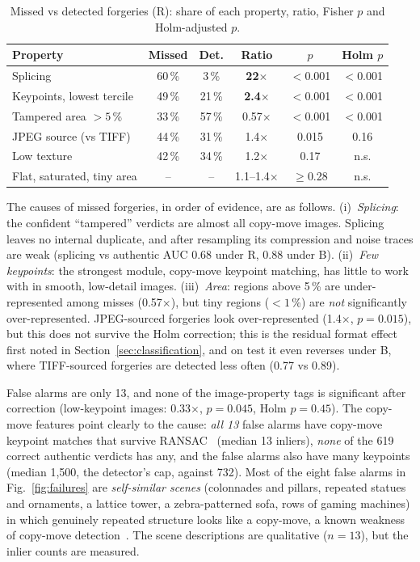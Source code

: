 \begin{table}[t]
\centering
\caption{Missed vs detected forgeries (R): share of each property, ratio, Fisher $p$ and Holm-adjusted
$p$.}\label{tab:test-fisher}
\footnotesize
\setlength{\tabcolsep}{4pt}
\begin{tabular}{lccccc}
\toprule
Property & Missed & Det. & Ratio & $p$ & Holm $p$ \\
\midrule
Splicing                    & 60\,\% & 3\,\%  & \textbf{22$\times$}  & $<$0.001 & $<$0.001 \\
Keypoints, lowest tercile   & 49\,\% & 21\,\% & \textbf{2.4$\times$} & $<$0.001 & $<$0.001 \\
Tampered area $>5$\,\%      & 33\,\% & 57\,\% & 0.57$\times$ & $<$0.001 & $<$0.001 \\
JPEG source (vs TIFF)       & 44\,\% & 31\,\% & 1.4$\times$  & 0.015 & 0.16 \\
Low texture                 & 42\,\% & 34\,\% & 1.2$\times$  & 0.17  & n.s. \\
Flat, saturated, tiny area  & --     & --     & 1.1--1.4$\times$ & $\geq$0.28 & n.s. \\
\bottomrule
\end{tabular}
\end{table}

The causes of missed forgeries, in order of evidence, are as follows. (i)~\emph{Splicing}: the confident
``tampered'' verdicts are almost all copy-move images. Splicing leaves no internal duplicate, and after
resampling its compression and noise traces are weak (splicing vs authentic AUC 0.68 under R, 0.88 under B).
(ii)~\emph{Few keypoints}: the strongest module, copy-move keypoint matching, has little to work with in smooth,
low-detail images. (iii)~\emph{Area}: regions above 5\,\% are under-represented among misses (0.57$\times$), but
tiny regions ($<1$\,\%) are \emph{not} significantly over-represented. JPEG-sourced forgeries look
over-represented (1.4$\times$, $p=0.015$), but this does not survive the Holm correction; this is the residual
format effect first noted in Section~\ref{sec:classification}, and on test it even reverses under B, where
TIFF-sourced forgeries are detected less often (0.77 vs 0.89).

False alarms are only 13, and none of the image-property tags is significant after correction (low-keypoint
images: 0.33$\times$, $p=0.045$, Holm $p=0.45$). The copy-move features point clearly to the cause: \emph{all 13}
false alarms have copy-move keypoint matches that survive RANSAC~\cite{fischler1981ransac} (median 13 inliers), \emph{none} of the 619
correct authentic verdicts has any, and the false alarms also have many keypoints (median 1,500, the detector's
cap, against 732). Most of the eight false alarms in Fig.~\ref{fig:failures} are \emph{self-similar scenes}
(colonnades and pillars, repeated statues and ornaments, a lattice tower, a zebra-patterned sofa, rows of gaming
machines) in which genuinely repeated structure looks like a copy-move, a known weakness of copy-move
detection~\cite{christlein2012eval,wen2016coverage}. The scene descriptions are qualitative ($n=13$), but the inlier counts are
measured.

